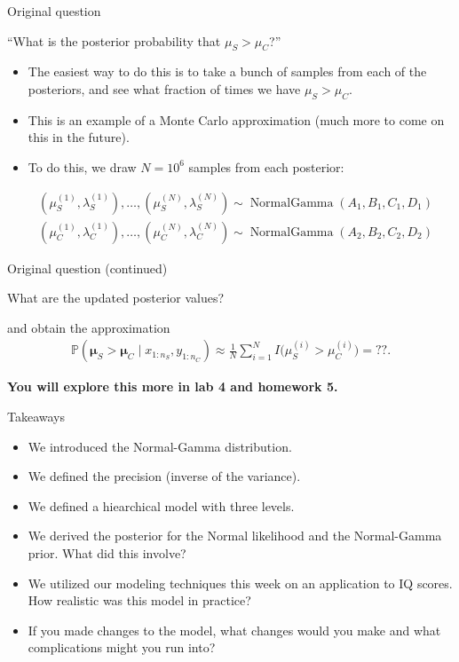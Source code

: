 \documentclass[
  ignorenonframetext,
]{beamer}
\providecommand{\tightlist}{%
  \setlength{\itemsep}{0pt}\setlength{\parskip}{0pt}}
\DeclareMathOperator*{\NormalGamma}{NormalGamma}
\renewcommand{\Pr}{\mathbb{P}}
\begin{document}
\begin{frame}{Original question}
\protect\hypertarget{original-question}{}

``What is the posterior probability that \(\mu_S>\mu_C\)?''

\begin{itemize}
\item
  The easiest way to do this is to take a bunch of samples from each of
  the posteriors, and see what fraction of times we have
  \(\mu_S>\mu_C\).
\item
  This is an example of a Monte Carlo approximation (much more to come
  on this in the future).
\item
  To do this, we draw \(N=10^6\) samples from each posterior:
\end{itemize}

\begin{align*}
&(\mu_S^{(1)},\lambda_S^{(1)}),\dotsc,(\mu_S^{(N)},\lambda_S^{(N)})\sim \NormalGamma(A_1,B_1,C_1,D_1)\\
&(\mu_C^{(1)},\lambda_C^{(1)}),\dotsc,(\mu_C^{(N)},\lambda_C^{(N)})\sim\NormalGamma(A_2,B_2,C_2,D_2)
\end{align*}

\end{frame}

\begin{frame}{Original question (continued)}
\protect\hypertarget{original-question-continued}{}

What are the updated posterior values?

and obtain the approximation \begin{align*}
\Pr(\bm\mu_S > \bm\mu_C \mid x_{1:n_S},y_{1:n_C}) 
\approx \frac{1}{N} \sum_{i = 1}^N I\big(\mu_S^{(i)}>\mu_C^{(i)}\big) = ??.
\end{align*}

\textbf{You will explore this more in lab 4 and homework 5.}

\end{frame}

\begin{frame}{Takeaways}
\protect\hypertarget{takeaways}{}

\begin{itemize}
\tightlist
\item
  We introduced the Normal-Gamma distribution.
\item
  We defined the precision (inverse of the variance).
\item
  We defined a hiearchical model with three levels.
\item
  We derived the posterior for the Normal likelihood and the
  Normal-Gamma prior. What did this involve?
\item
  We utilized our modeling techniques this week on an application to IQ
  scores. How realistic was this model in practice?
\item
  If you made changes to the model, what changes would you make and what
  complications might you run into?
\end{itemize}

\end{frame}
\end{document}
